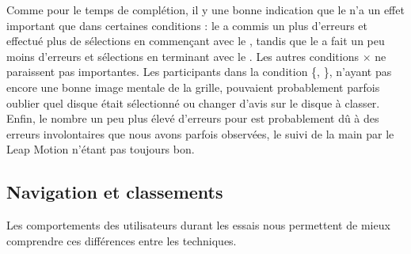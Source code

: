 Comme pour le temps de complétion, il y une bonne indication que le  n'a un effet important que dans certaines conditions  : le  a commis un plus d'erreurs et effectué plus de sélections en commençant avec le , tandis que le  a fait un peu moins d'erreurs et sélections en terminant avec le . Les autres conditions  $\times$  ne paraissent pas importantes. Les participants dans la condition \{, \}, n'ayant pas encore une bonne image mentale de la grille, pouvaient probablement parfois oublier quel disque était sélectionné ou changer d'avis sur le disque à classer. Enfin, le nombre un peu plus élevé d'erreurs pour  est probablement dû à des erreurs involontaires que nous avons parfois observées, le suivi de la main par le Leap Motion n'étant pas toujours bon.

\subsection{Navigation et classements}
\label{subsec:experiment_results_operations}

Les comportements des utilisateurs durant les essais nous permettent de mieux comprendre ces différences entre les techniques.



